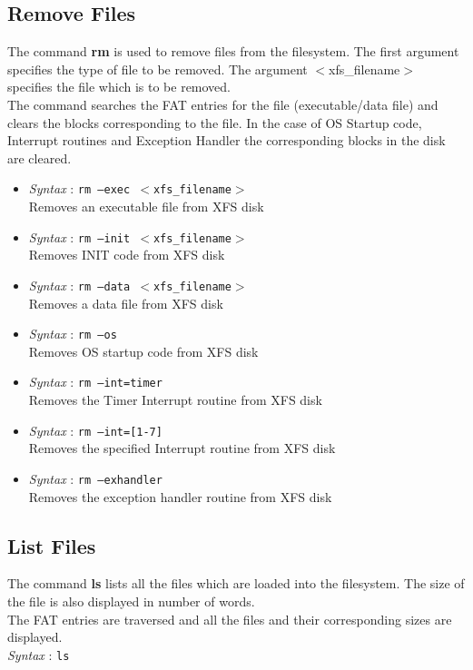 \documentclass[11pt]{report}
\begin{document}
\subsection{Remove Files}
The command \textbf{rm} is used to remove files from the filesystem. The first argument specifies the type of file to be removed. The argument $<$xfs\_filename$>$ specifies the file which is to be removed.\\
The command searches the FAT entries for the file (executable/data file) and clears the blocks corresponding to the file. In the case of OS Startup code, Interrupt routines and Exception Handler the corresponding blocks in the disk are cleared.
\begin{itemize}
	\item \textit{Syntax} : \texttt{rm --exec $<$xfs\_filename$>$} \\
	 Removes an executable file from XFS disk 
	\item \textit{Syntax} : \texttt{rm --init  $<$xfs\_filename$>$ }\\
	 Removes INIT code from XFS disk 
	\item \textit{Syntax} : \texttt{rm --data	$<$xfs\_filename$>$}\\
	 Removes a data file from XFS disk 
	\item \textit{Syntax} : \texttt{rm --os} \\
	 Removes OS startup code from XFS disk 
	\item \textit{Syntax} : \texttt{rm --int=timer} \\
	 Removes the Timer Interrupt routine from XFS disk 
	\item \textit{Syntax} : \texttt{rm --int=[1-7] }\\
	 Removes the specified Interrupt routine from XFS disk 
	\item \textit{Syntax} : \texttt{rm --exhandler}\\
	 Removes the exception handler routine from XFS disk 
	
\end{itemize}
 
 
\subsection{List Files}
The command \textbf{ls} lists all the files which are loaded into the filesystem. The size of the file is also displayed in number of words.\\
The FAT entries are traversed and all the files and their corresponding sizes are displayed. \\
\textit{Syntax} : \texttt{ls}
\end{document}
